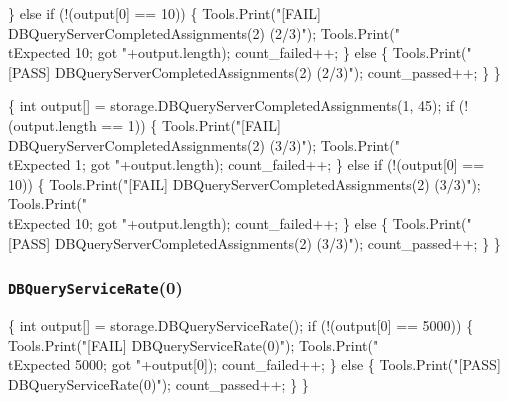 \documentclass{article}
\def\nwendcode{\endtrivlist \endgroup}
\let\nwdocspar=\par
\begin{document}
  \} else if (!(output[0] == 10)) \{
    Tools.Print("[FAIL] DBQueryServerCompletedAssignments(2) (2/3)");
    Tools.Print("\\tExpected 10; got "+output.length);
    count_failed++;
  \} else \{
    Tools.Print("[PASS] DBQueryServerCompletedAssignments(2) (2/3)");
    count_passed++;
  \}
\}
\nwendcode{}\nwdocspar
\nwenddocs{}\endmoddef{}
\{
  int output[] = storage.DBQueryServerCompletedAssignments(1, 45);
  if (!(output.length == 1)) \{
    Tools.Print("[FAIL] DBQueryServerCompletedAssignments(2) (3/3)");
    Tools.Print("\\tExpected 1; got "+output.length);
    count_failed++;
  \} else if (!(output[0] == 10)) \{
    Tools.Print("[FAIL] DBQueryServerCompletedAssignments(2) (3/3)");
    Tools.Print("\\tExpected 10; got "+output.length);
    count_failed++;
  \} else \{
    Tools.Print("[PASS] DBQueryServerCompletedAssignments(2) (3/3)");
    count_passed++;
  \}
\}
\nwendcode{}\nwdocspar
\subsubsection{{\tt{}DBQueryServiceRate}(0)}
\nwenddocs{}\endmoddef{}
\{
  int output[] = storage.DBQueryServiceRate();
  if (!(output[0] == 5000)) \{
    Tools.Print("[FAIL] DBQueryServiceRate(0)");
    Tools.Print("\\tExpected 5000; got "+output[0]);
    count_failed++;
  \} else \{
    Tools.Print("[PASS] DBQueryServiceRate(0)");
    count_passed++;
  \}
\}
\nwendcode{}\nwdocspar
\end{document}
